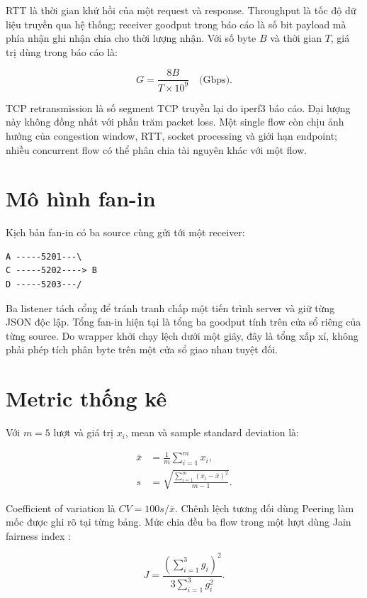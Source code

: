 RTT là thời gian khứ hồi của một request và response. Throughput là tốc độ dữ
liệu truyền qua hệ thống; receiver goodput trong báo cáo là số bit payload mà
phía nhận ghi nhận chia cho thời lượng nhận. Với số byte $B$ và thời gian
$T$, giá trị dùng trong báo cáo là:

\begin{equation}
G=\frac{8B}{T\times10^9}\quad\text{(Gbps)}.
\end{equation}

TCP retransmission là số segment TCP truyền lại do iperf3 báo cáo. Đại lượng
này không đồng nhất với phần trăm packet loss. Một single flow còn chịu ảnh
hưởng của congestion window, RTT, socket processing và giới hạn endpoint;
nhiều concurrent flow có thể phân chia tài nguyên khác với một flow.

\section{Mô hình fan-in}

Kịch bản fan-in có ba source cùng gửi tới một receiver:

\begin{verbatim}
A -----5201---\
C -----5202----> B
D -----5203---/
\end{verbatim}

Ba listener tách cổng để tránh tranh chấp một tiến trình server và giữ từng
JSON độc lập. Tổng fan-in hiện tại là tổng ba goodput tính trên cửa sổ riêng
của từng source. Do wrapper khởi chạy lệch dưới một giây, đây là tổng xấp xỉ,
không phải phép tích phân byte trên một cửa sổ giao nhau tuyệt đối.

\section{Metric thống kê}

Với $m=5$ lượt và giá trị $x_i$, mean và sample standard deviation là:

\begin{align}
\bar{x}&=\frac{1}{m}\sum_{i=1}^{m}x_i,\\
s&=\sqrt{\frac{\sum_{i=1}^{m}(x_i-\bar{x})^2}{m-1}}.
\end{align}

Coefficient of variation là $CV=100s/\bar{x}$. Chênh lệch tương đối dùng
Peering làm mốc được ghi rõ tại từng bảng. Mức chia đều ba flow trong một lượt
dùng Jain fairness index \cite{jain-fairness}:

\begin{equation}
J=\frac{(\sum_{i=1}^{3}g_i)^2}{3\sum_{i=1}^{3}g_i^2}.
\end{equation}

